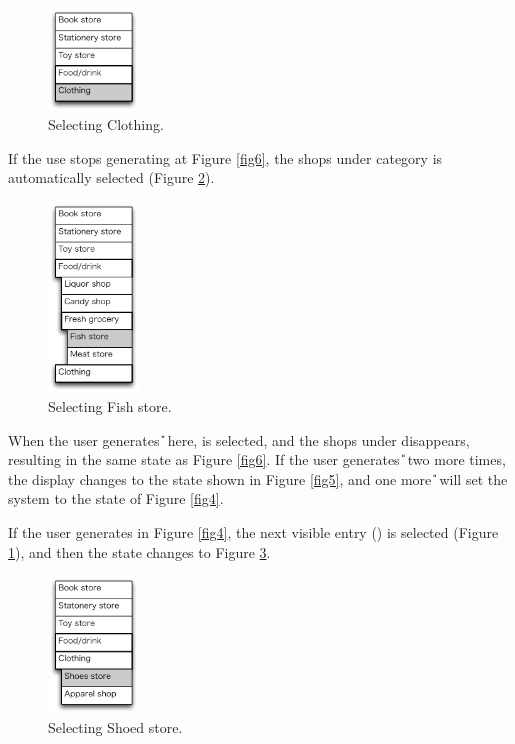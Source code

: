 \documentclass{article}
\begin{document}
\begin{figure}[H]
\centerline{\includegraphics[width=24mm,bb=0 0 139 157]{figures/fig8.pdf}}
\caption{Selecting Clothing.}
\label{fig8}
\end{figure}

If the use stops generating {\D} at Figure \ref{fig6},
the shops under category  is automatically selected (Figure \ref{fig7}).

\begin{figure}[H]
\centerline{\includegraphics[width=24mm,bb=0 0 139 292]{figures/fig7.pdf}}
\caption{Selecting Fish store.}
\label{fig7}
\end{figure}

When the user generates {\U} here,  is selected,
and the shops under  disappears, 
resulting in the same state as Figure \ref{fig6}.
If the user generates {\U} two more times, the display changes to the state
shown in Figure \ref{fig5},
and one more {\U} will set the system to the state of Figure \ref{fig4}.

If the user generates {\D} in Figure \ref{fig4}, the next visible entry
() is selected (Figure \ref{fig8}), and then the state changes to Figure \ref{fig9}.

\begin{figure}[H]
\centerline{\includegraphics[width=24mm,bb=0 0 139 211]{figures/fig9.pdf}}
\caption{Selecting Shoed store.}
\label{fig9}
\end{figure}
\end{document}
